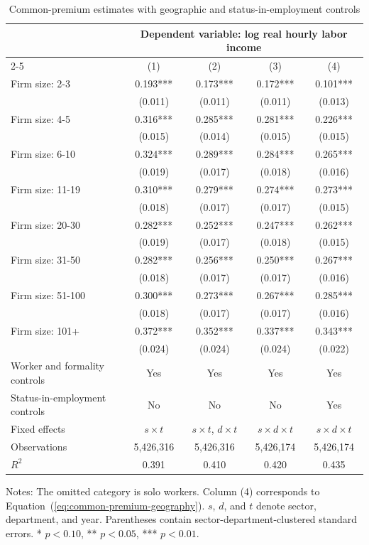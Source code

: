 \begin{table}[htbp]
  \centering
  \caption{Common-premium estimates with geographic and status-in-employment controls}
  \label{tab:firm-size-local-geography-robustness}
  \small
  \begin{tabular}{lcccc}
    \toprule
    & \multicolumn{4}{c}{Dependent variable: log real hourly labor income} \\
    \cmidrule(lr){2-5}
    & (1) & (2) & (3) & (4) \\
    \midrule
    Firm size: 2-3 & 0.193*** & 0.173*** & 0.172*** & 0.101*** \\
     & (0.011) & (0.011) & (0.011) & (0.013) \\
    Firm size: 4-5 & 0.316*** & 0.285*** & 0.281*** & 0.226*** \\
     & (0.015) & (0.014) & (0.015) & (0.015) \\
    Firm size: 6-10 & 0.324*** & 0.289*** & 0.284*** & 0.265*** \\
     & (0.019) & (0.017) & (0.018) & (0.016) \\
    Firm size: 11-19 & 0.310*** & 0.279*** & 0.274*** & 0.273*** \\
     & (0.018) & (0.017) & (0.017) & (0.015) \\
    Firm size: 20-30 & 0.282*** & 0.252*** & 0.247*** & 0.262*** \\
     & (0.019) & (0.017) & (0.018) & (0.015) \\
    Firm size: 31-50 & 0.282*** & 0.256*** & 0.250*** & 0.267*** \\
     & (0.018) & (0.017) & (0.017) & (0.016) \\
    Firm size: 51-100 & 0.300*** & 0.273*** & 0.267*** & 0.285*** \\
     & (0.018) & (0.017) & (0.017) & (0.016) \\
    Firm size: 101+ & 0.372*** & 0.352*** & 0.337*** & 0.343*** \\
     & (0.024) & (0.024) & (0.024) & (0.022) \\
    \midrule
    Worker and formality controls & Yes & Yes & Yes & Yes \\
    Status-in-employment controls & No & No & No & Yes \\
    Fixed effects & $s\times t$ & $s\times t$, $d\times t$ & $s\times d\times t$ & $s\times d\times t$ \\
    Observations & 5,426,316 & 5,426,316 & 5,426,174 & 5,426,174 \\
    $R^2$ & 0.391 & 0.410 & 0.420 & 0.435 \\
    \bottomrule
  \end{tabular}
  \vspace{0.3em}
  \begin{minipage}{0.95\textwidth}
  \footnotesize
  Notes: The omitted category is solo workers. Column (4) corresponds to Equation~(\ref{eq:common-premium-geography}). $s$, $d$, and $t$ denote sector, department, and year. Parentheses contain sector-department-clustered standard errors. * $p<0.10$, ** $p<0.05$, *** $p<0.01$.
  \end{minipage}
\end{table}

